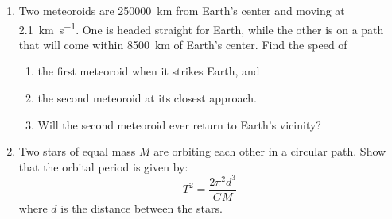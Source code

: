 \documentclass{../../../oss-apphys}
\begin{document}
\begin{enumerate}[leftmargin=15pt]
  \newpage
  
\item Two meteoroids are \SI{250000}{\kilo\metre} from Earth's center and moving
  at \SI{2.1}{\kilo\metre\per\second}. One is headed straight for Earth, while
  the other is on a path that will come within \SI{8500}{\kilo\metre} of Earth's
  center. Find the speed of
  \begin{enumerate}[noitemsep,leftmargin=20pt]
  \item the first meteoroid when it strikes Earth, and
  \item the second meteoroid at its closest approach.
  \item Will the second meteoroid ever return to Earth's vicinity?
  \end{enumerate}
  \vspace{2.5in}

\item Two stars of equal mass $M$ are orbiting each other in a circular path.
  Show that the orbital period is given by:
  \begin{displaymath}
    T^2=\frac{2\pi^2d^3}{GM}
  \end{displaymath}
  where $d$ is the distance between the stars.
  \newpage
  

\end{enumerate}
\end{document}
